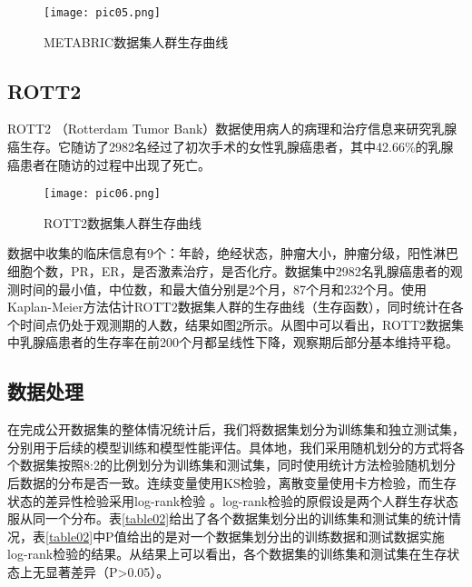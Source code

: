 \begin{figure}[H]
\texttt{[image: pic05.png]}
\caption{METABRIC数据集人群生存曲线}
\label{pic05}
\end{figure}

\subsection{ROTT2}

ROTT2 （Rotterdam Tumor Bank）数据使用病人的病理和治疗信息来研究乳腺癌生存。它随访了2982名经过了初次手术的女性乳腺癌患者，其中42.66\%的乳腺癌患者在随访的过程中出现了死亡。

\begin{figure}[H]
\texttt{[image: pic06.png]}
\caption{ROTT2数据集人群生存曲线}
\label{pic06}
\end{figure}

数据中收集的临床信息有9个：年龄，绝经状态，肿瘤大小，肿瘤分级，阳性淋巴细胞个数，PR，ER，是否激素治疗，是否化疗。数据集中2982名乳腺癌患者的观测时间的最小值，中位数，和最大值分别是2个月，87个月和232个月。使用Kaplan-Meier方法估计ROTT2数据集人群的生存曲线（生存函数），同时统计在各个时间点仍处于观测期的人数，结果如图\ref{pic06}所示。从图中可以看出，ROTT2数据集中乳腺癌患者的生存率在前200个月都呈线性下降，观察期后部分基本维持平稳。

\subsection{数据处理}

在完成公开数据集的整体情况统计后，我们将数据集划分为训练集和独立测试集，分别用于后续的模型训练和模型性能评估。具体地，我们采用随机划分的方式将各个数据集按照8:2的比例划分为训练集和测试集，同时使用统计方法检验随机划分后数据的分布是否一致。连续变量使用KS检验，离散变量使用卡方检验，而生存状态的差异性检验采用log-rank检验 。log-rank检验的原假设是两个人群生存状态服从同一个分布。表\ref{table02}给出了各个数据集划分出的训练集和测试集的统计情况，表\ref{table02}中P值给出的是对一个数据集划分出的训练数据和测试数据实施log-rank检验的结果。从结果上可以看出，各个数据集的训练集和测试集在生存状态上无显著差异（P>0.05）。

